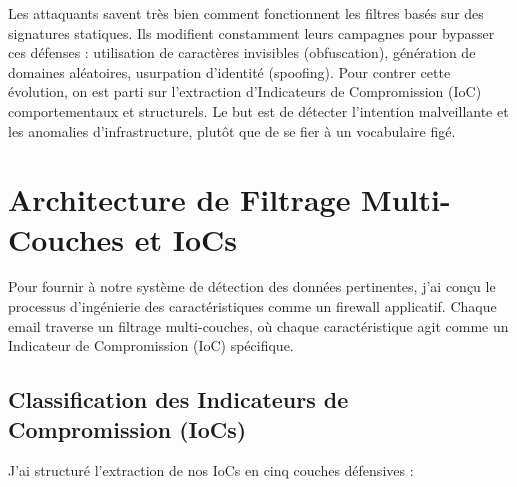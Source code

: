 Les attaquants savent très bien comment fonctionnent les filtres basés sur des signatures statiques. Ils modifient constamment leurs campagnes pour bypasser ces défenses : utilisation de caractères invisibles (obfuscation), génération de domaines aléatoires, usurpation d'identité (spoofing). Pour contrer cette évolution, on est parti sur l'extraction d'Indicateurs de Compromission (IoC) comportementaux et structurels. Le but est de détecter l'intention malveillante et les anomalies d'infrastructure, plutôt que de se fier à un vocabulaire figé.

\section{Architecture de Filtrage Multi-Couches et IoCs}

Pour fournir à notre système de détection des données pertinentes, j'ai conçu le processus d'ingénierie des caractéristiques comme un firewall applicatif. Chaque email traverse un filtrage multi-couches, où chaque caractéristique agit comme un Indicateur de Compromission (IoC) spécifique.

\subsection{Classification des Indicateurs de Compromission (IoCs)}

J'ai structuré l'extraction de nos IoCs en cinq couches défensives :


